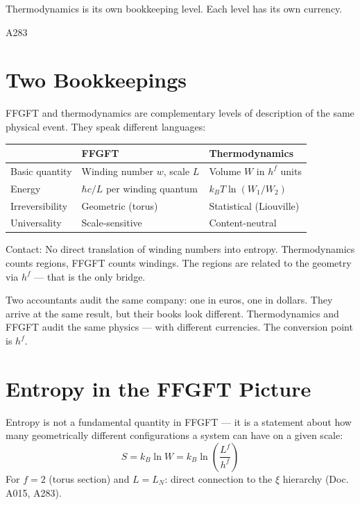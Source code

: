 \label{ch:thermodynamik}

\epigraph{Thermodynamics is its own bookkeeping level.
Each level has its own currency.}{A283}

\section{Two Bookkeepings}

FFGFT and thermodynamics are complementary levels of description of the same
physical event. They speak different languages: 

\begin{center}
\begingroup\small
\begin{tabular}{@{}p{2.2cm}p{3.8cm}p{3.8cm}@{}}
\toprule
& \textbf{FFGFT} & \textbf{Thermodynamics} \\
\midrule
Basic quantity
  & Winding number $w$, scale $L$
  & Volume $W$ in $h^f$ units \\[3pt]
Energy
  & $\hbar c / L$ per winding quantum
  & $k_BT\ln(W_1/W_2)$ \\[3pt]
Irre\-ver\-si\-bi\-li\-ty
  & Geometric (torus)
  & Statistical (Liouville) \\[3pt]
Univer\-sality
  & Scale-sensitive
  & Content-neutral \\
\bottomrule
\end{tabular}
\endgroup
\end{center}

Contact: No direct translation of winding numbers into entropy.
Thermodynamics counts regions, FFGFT counts windings. The regions
are related to the geometry via $h^f$ --- that is the only bridge.

\begin{laierspur}
Two accountants audit the same company: one in euros, one in dollars.
They arrive at the same result, but their books look different.
Thermodynamics and FFGFT audit the same physics --- with different
currencies. The conversion point is $h^f$.
\end{laierspur}

\section{Entropy in the FFGFT Picture}

Entropy is not a fundamental quantity in FFGFT --- it is a
statement about how many geometrically different configurations
a system can have on a given scale:
\[
  S = k_B \ln W = k_B \ln\!\left(\frac{L^f}{h^f}\right)
\]
For $f = 2$ (torus section) and $L = L_N$: direct connection to the
$\xi$ hierarchy (Doc.\,A015, A283). 

